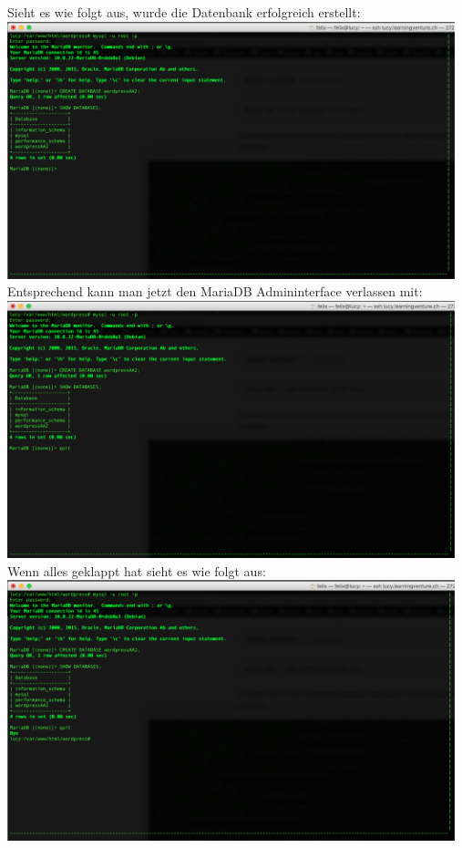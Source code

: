 \documentclass{article}
\begin{document}
	\newline
	Sieht es wie folgt aus, wurde die Datenbank erfolgreich erstellt:
	\newline
	\includegraphics[width=13cm]{../Pics/25-maria-db-show-success}
	\newline
	Entsprechend kann man jetzt den MariaDB Admininterface verlassen mit:
	\newline
	\includegraphics[width=13cm]{../Pics/26-maria-db-quit}
	\newline
	Wenn alles geklappt hat sieht es wie folgt aus:
	\newline
	\includegraphics[width=13cm]{../Pics/27-maria-db-quit-success}
	\newline
	
\end{document}
